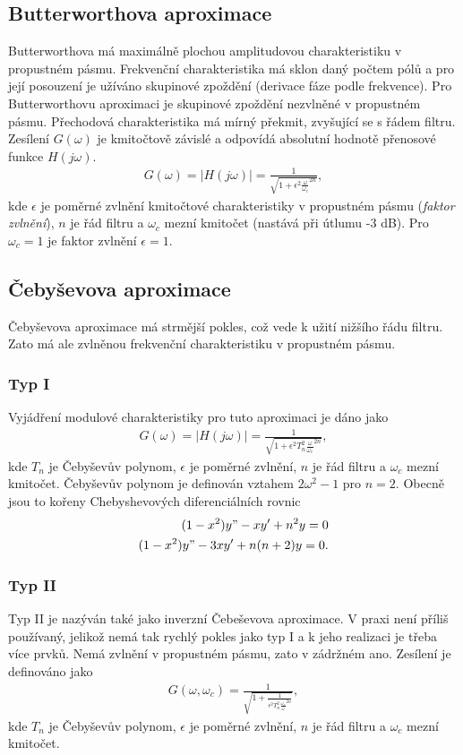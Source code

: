 \documentclass[twoside]{article}
\begin{document}
\subsection{Butterworthova aproximace}
Butterworthova má maximálně plochou amplitudovou charakteristiku v propustném pásmu. Frekvenční charakteristika má sklon daný počtem pólů a pro její posouzení je užíváno skupinové zpoždění (derivace fáze podle frekvence). Pro Butterworthovu aproximaci je skupinové zpoždění nezvlněné v propustném pásmu. Přechodová charakteristika má mírný překmit, zvyšující se s řádem filtru. Zesílení $G(\omega)$ je kmitočtově závislé a odpovídá absolutní hodnotě přenosové funkce $H(j\omega)$.
\begin{align}
G(\omega) = |H(j\omega)| = \frac{1}{\sqrt{1 + \epsilon ^2 \frac{\omega}{\omega _c}^{2n}}},
\end{align}
kde $\epsilon$ je poměrné zvlnění kmitočtové charakteristiky v propustném pásmu (\textit{faktor zvlnění}), $n$ je řád filtru a $\omega _c$ mezní kmitočet (nastává při útlumu -3 dB). Pro $\omega _c = 1$ je faktor zvlnění $\epsilon = 1$. 
\subsection{Čebyševova aproximace}
Čebyševova aproximace má strmější pokles, což vede k užití nižšího řádu filtru. Zato má ale zvlněnou frekvenční charakteristiku v propustném pásmu. 
\subsubsection{Typ I}
Vyjádření modulové charakteristiky pro tuto aproximaci je dáno jako
\begin{align}
G(\omega) = |H(j\omega)| = \frac{1}{\sqrt{1 + \epsilon ^2 T_n ^2 \frac{\omega}{\omega _c}^{2n}}},
\end{align}
kde $T_n$ je Čebyševův polynom, $\epsilon$ je poměrné zvlnění, $n$ je řád filtru a $\omega _c$ mezní kmitočet. Čebyševův polynom je definován vztahem $2 \omega ^2 - 1$ pro $n = 2$. Obecně jsou to kořeny Chebyshevových diferenciálních rovnic
\begin{align}
(1 - x^2)y" - xy' + n^2y = 0\\
(1 - x^2)y" - 3xy' + n(n+2)y = 0.
\end{align}
\subsubsection{Typ II}
Typ II je nazýván také jako inverzní Čebeševova aproximace. V praxi není příliš používaný, jelikož nemá tak rychlý pokles jako typ I a k jeho realizaci je třeba více prvků. Nemá zvlnění v propustném pásmu, zato v zádržném ano. Zesílení je definováno jako
\begin{align}
G(\omega, \omega _c) = \frac{1}{\sqrt{1 + \frac{1}{\epsilon ^2 T_n ^2 \frac{\omega _c}{\omega}^{2n}}}},
\end{align}
kde $T_n$ je Čebyševův polynom, $\epsilon$ je poměrné zvlnění, $n$ je řád filtru a $\omega _c$ mezní kmitočet.
\end{document}
